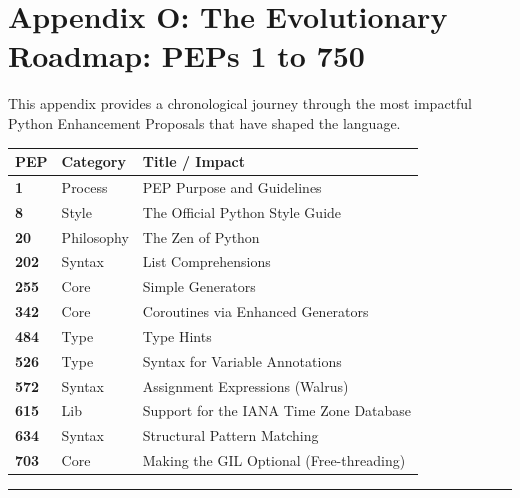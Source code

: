 \hypertarget{appendix-o-the-evolutionary-roadmap-peps-1-to-750}{%
\chapter{Appendix O: The Evolutionary Roadmap: PEPs 1 to
750}\label{appendix-o-the-evolutionary-roadmap-peps-1-to-750}}

This appendix provides a chronological journey through the most
impactful Python Enhancement Proposals that have shaped the language.

\begin{longtable}[]{@{}lll@{}}
\toprule
PEP & Category & Title / Impact \\
\midrule
\endhead
\textbf{1} & Process & PEP Purpose and Guidelines \\
\textbf{8} & Style & The Official Python Style Guide \\
\textbf{20} & Philosophy & The Zen of Python \\
\textbf{202} & Syntax & List Comprehensions \\
\textbf{255} & Core & Simple Generators \\
\textbf{342} & Core & Coroutines via Enhanced Generators \\
\textbf{484} & Type & Type Hints \\
\textbf{526} & Type & Syntax for Variable Annotations \\
\textbf{572} & Syntax & Assignment Expressions (Walrus) \\
\textbf{615} & Lib & Support for the IANA Time Zone Database \\
\textbf{634} & Syntax & Structural Pattern Matching \\
\textbf{703} & Core & Making the GIL Optional (Free-threading) \\
\bottomrule
\end{longtable}

\begin{center}\rule{0.5\linewidth}{0.5pt}\end{center}
